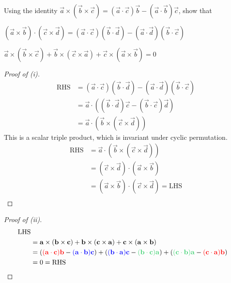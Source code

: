 \documentclass[12pt]{article}
\begin{document}
    \begin{question}
        Using the identity 
        $\vec{a}\times(\vec{b}\times\vec{c}) 
        = (\vec{a}\cdot\vec{c})\vec{b}-(\vec{a}\cdot\vec{b})\vec{c}$,
        show that
        \begin{compactenum}[(i)]
        \item $(\vec{a}\times\vec{b})\cdot(\vec{c}\times\vec{d})
            = (\vec{a}\cdot\vec{c})(\vec{b}\cdot\vec{d})
            -(\vec{a}\cdot\vec{d})(\vec{b}\cdot\vec{c})$
        \item $\vec{a}\times(\vec{b}\times\vec{c})
            + \vec{b}\times(\vec{c}\times\vec{a})
            + \vec{c}\times(\vec{a}\times\vec{b})
            = 0$
        \end{compactenum}
    \end{question}
    \begin{proof}[Proof of (i)]
        \begin{align*}
            \text{RHS} 
            &= (\vec{a}\cdot\vec{c})(\vec{b}\cdot\vec{d})
            -(\vec{a}\cdot\vec{d})(\vec{b}\cdot\vec{c})\\
            &= \vec{a}\cdot((\vec{b}\cdot\vec{d})\vec{c} - (\vec{b}\cdot\vec{c})\vec{d})\\
            &= \vec{a}\cdot(\vec{b}\times(\vec{c}\times\vec{d}))
        \end{align*}
        This is a scalar triple product, which is invariant under cyclic permutation.
        \begin{align*}
            \text{RHS}
            &= \vec{a}\cdot(\vec{b}\times(\vec{c}\times\vec{d}))\\
            &= (\vec{c}\times\vec{d})\cdot(\vec{a}\times\vec{b})\\
            &= (\vec{a}\times\vec{b})\cdot(\vec{c}\times\vec{d}) = \text{LHS}\\
        \end{align*}
    \end{proof}

    \begin{proof}[Proof of (ii)]
        \begin{align*}
            \text{LHS}\\
            &= \vec{a}\times(\vec{b}\times\vec{c})
            + \vec{b}\times(\vec{c}\times\vec{a})
            + \vec{c}\times(\vec{a}\times\vec{b})\\
            &=
            (\mathcolor{red}{(\vec{a}\cdot\vec{c})\vec{b}}
            - \mathcolor{blue}{(\vec{a}\cdot\vec{b})\vec{c}})
            + (\mathcolor{blue}{(\vec{b}\cdot\vec{a})\vec{c}}
            - \mathcolor{ufogreen}{(\vec{b}\cdot\vec{c})\vec{a}})
            + (\mathcolor{ufogreen}{(\vec{c}\cdot\vec{b})\vec{a}}
            - \mathcolor{red}{(\vec{c}\cdot\vec{a})\vec{b}})\\
            &= 0 = \text{RHS}
        \end{align*}
    \end{proof}
\end{document}
